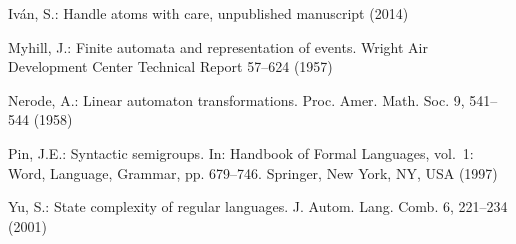 \documentclass{llncs}
\begin{document}
\begin{thebibliography}{10}
Iv\'an, S.: Handle atoms with care, unpublished manuscript (2014)

Myhill, J.: Finite automata and representation of events. Wright Air
  Development Center Technical Report  57--624 (1957)

Nerode, A.: Linear automaton transformations. Proc. Amer. Math. Soc.  9,
  541--544 (1958)

Pin, J.E.: Syntactic semigroups. In: Handbook of Formal Languages, vol.~1:
  Word, Language, Grammar, pp. 679--746. Springer, New York, NY, USA (1997)

Yu, S.: State complexity of regular languages. J. Autom. Lang. Comb.  6,
  221--234 (2001)

\end{thebibliography}
\end{document}
